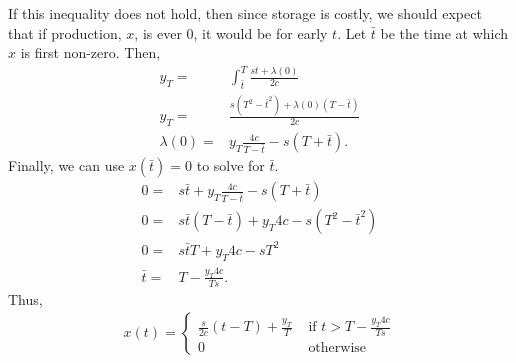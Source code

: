 \begin{example}[Inventory]
  If this inequality does not hold, then since storage is costly, we
  should expect that if production, $x$, is ever $0$, it would be
  for early $t$. Let $\bar{t}$ be the time at which $x$ is first
  non-zero. Then,
  \begin{align*}
    y_T = & \int_{\bar{t}}^T \frac{st + \lambda(0)}{2c} \\
    y_T = & \frac{s(T^2 - \bar{t}^2) + \lambda(0) (T-\bar{t})}{2c} \\
    \lambda(0) = & y_T \frac{4c}{T-\bar{t}} - s(T+\bar{t}).
  \end{align*}
  Finally, we can use $x(\bar{t}) = 0$ to solve for $\bar{t}$.
  \begin{align*}
    0 = & s\bar{t} + y_T \frac{4c}{T-\bar{t}} - s(T+\bar{t})
    \\
    0 = & s\bar{t}(T-\bar{t}) + y_T 4c - s (T^2 - \bar{t}^2) \\
    0 = & s \bar{t} T + y_T 4c - s T^2 \\
    \bar{t} = & T - \frac{y_T 4c}{T s}.
  \end{align*}
  Thus,
  \begin{align*}
    x(t) = \begin{cases} 
      \frac{s}{2c} (t - T) + \frac{y_T}{T} & \text{ if } t > T -
      \frac{y_T 4c}{T s} \\
      0 & \text{ otherwise }
    \end{cases}
  \end{align*}      
\end{example}


